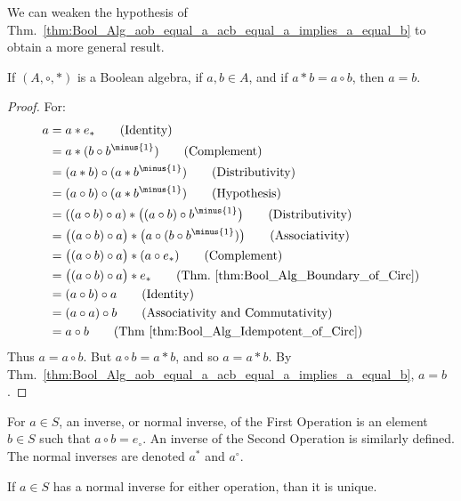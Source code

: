     We can weaken the hypothesis of
    Thm.~\ref{thm:Bool_Alg_aob_equal_a_acb_equal_a_implies_a_equal_b} to obtain
    a more general result.
    \begin{theorem}
        \label{thm:Bool_Alg_aob_equal_acb_implies_a_equal_b}
        If $(A,\circ,*)$ is a Boolean algebra, if $a,b\in{A}$, and if
        $a*b=a\circ{b}$, then $a=b$.
    \end{theorem}
    \begin{proof}
        For:
        \begin{align}
            a&=a*e_{*}
            \tag{Identity}\\
            &=a*(b\circ{b}^{\minus{1}})
            \tag{Complement}\\
            &=(a*b)\circ(a*b^{\minus{1}})
            \tag{Distributivity}\\
            &=(a\circ{b})\circ(a*b^{\minus{1}})
            \tag{Hypothesis}\\
            &=((a\circ{b})\circ{a})*
                \big((a\circ{b})\circ{b}^{\minus{1}}\big)
            \tag{Distributivity}\\
            &=\big((a\circ{b})\circ{a}\big)*
                \big(a\circ(b\circ{b}^{\minus{1}})\big)
            \tag{Associativity}\\
            &=\big((a\circ{b})\circ{a}\big)*(a\circ{e}_{*})
            \tag{Complement}\\
            &=\big((a\circ{b})\circ{a}\big)*e_{*}
            \tag{Thm.~\ref{thm:Bool_Alg_Boundary_of_Circ}}\\
            &=(a\circ{b})\circ{a}
            \tag{Identity}\\
            &=(a\circ{a})\circ{b}
            \tag{Associativity and Commutativity}\\
            &=a\circ{b}
            \tag{Thm~\ref{thm:Bool_Alg_Idempotent_of_Circ}}
        \end{align}
        Thus $a=a\circ{b}$. But $a\circ{b}=a*{b}$, and so $a=a*{b}$. By
        Thm.~\ref{thm:Bool_Alg_aob_equal_a_acb_equal_a_implies_a_equal_b},
        $a=b$.
    \end{proof}
            \begin{definition} For $a\in S$, an inverse, or normal inverse, of the First Operation is an element $b\in S$ such that $a\circ b=e_{\circ}$. An inverse of the Second Operation is similarly defined. The normal inverses are denoted $a^{*}$ and $a^{\circ}$.
            \end{definition}
            \begin{theorem} If $a\in S$ has a normal inverse for either operation, than it is unique.
            \end{theorem}
